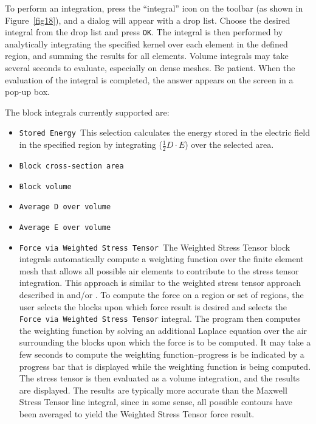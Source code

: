 \documentclass[12pt]{report}
\begin{document}
To perform an integration, press the ``integral'' icon on the
toolbar (as shown in Figure~\ref{fig18}), and a dialog will appear
with a drop list. Choose the desired integral from the drop list
and press \texttt{OK}. The integral is then performed by
analytically integrating the specified kernel over each element in
the defined region, and summing the results for all elements.
Volume integrals may take several seconds to evaluate, especially
on dense meshes. Be patient. When the evaluation of the integral is
completed, the answer appears on the screen in a pop-up box.





The block integrals currently supported are:


\begin{itemize}


\item \texttt{Stored Energy }This selection calculates the energy stored in the
electric field in the specified region by integrating ($\frac{1}{2}
D \cdot E$) over the selected area.

\item \texttt{Block cross-section area}

\item \texttt{Block volume}

\item \texttt{Average D over volume}

\item \texttt{Average E over volume}

\item \texttt{Force via Weighted Stress Tensor }The Weighted Stress Tensor block
integrals automatically compute a weighting function over the
finite element mesh that allows all possible air elements to
contribute to the stress tensor integration. This approach is
similar to the weighted stress tensor approach described in
\cite{mcfee} and/or \cite{henforce}. To compute the force on a region or
set of regions, the user selects the blocks upon which force result
is desired and selects the \texttt{Force via Weighted Stress
Tensor} integral. The program then computes the weighting function
by solving an additional Laplace equation over the air surrounding
the blocks upon which the force is to be computed. It may take a
few seconds to compute the weighting function--progress is be
indicated by a progress bar that is displayed while the weighting
function is being computed. The stress tensor is then evaluated as
a volume integration, and the results are displayed. The results
are typically more accurate than the Maxwell Stress Tensor line
integral, since in some sense, all possible contours have been
averaged to yield the Weighted Stress Tensor force result.



\end{itemize}
\end{document}
